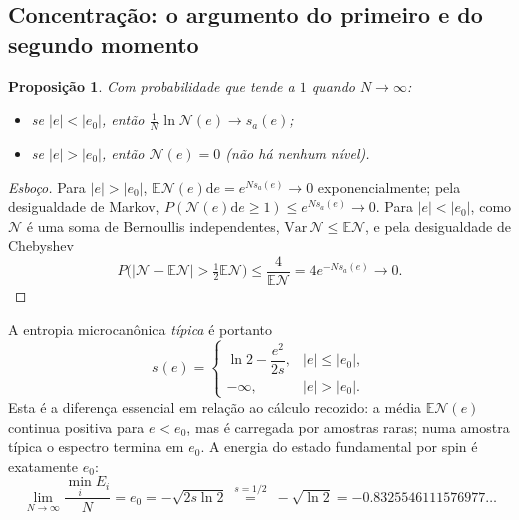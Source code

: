 \documentclass[11pt,a4paper]{article}
\newtheorem{proposicao}{Proposição}
\newcommand{\E}{\mathbb{E}}
\newcommand{\dd}{\mathrm{d}}
\begin{document}
\subsection{Concentração: o argumento do primeiro e do segundo momento}
\begin{proposicao}
Com probabilidade que tende a $1$ quando $N\to\infty$:
\begin{itemize}
\item se $|e|<|e_0|$, então $\frac1N\ln\mathcal N(e)\to s_a(e)$;
\item se $|e|>|e_0|$, então $\mathcal N(e)=0$ (não há nenhum nível).
\end{itemize}
\end{proposicao}
\begin{proof}[Esboço]
Para $|e|>|e_0|$, $\E\mathcal N(e)\dd e=e^{Ns_a(e)}\to0$ exponencialmente; pela desigualdade de
Markov, $P(\mathcal N(e)\dd e\ge1)\le e^{Ns_a(e)}\to0$. Para $|e|<|e_0|$, como $\mathcal N$ é uma soma de
Bernoullis independentes, $\mathrm{Var}\,\mathcal N\le\E\mathcal N$, e pela desigualdade de Chebyshev
\[
  P\Big(\big|\mathcal N-\E\mathcal N\big|>\tfrac12\E\mathcal N\Big)\le\frac{4}{\E\mathcal N}=4e^{-Ns_a(e)}\to0 .
\]
\end{proof}
A entropia microcanônica \emph{típica} é portanto
\begin{equation}
  s(e)=\begin{cases}\ln2-\dfrac{e^2}{2s}, & |e|\le|e_0|,\\[2mm] -\infty, & |e|>|e_0|.\end{cases}
  \label{eq:entropia}
\end{equation}
Esta é a diferença essencial em relação ao cálculo recozido: a média $\E\mathcal N(e)$ continua positiva
para $e<e_0$, mas é carregada por amostras raras; numa amostra típica o espectro termina em $e_0$.
A energia do estado fundamental por spin é exatamente $e_0$:
\begin{equation}
  \lim_{N\to\infty}\frac{\min_i E_i}{N}=e_0=-\sqrt{2s\ln2}
  \;\stackrel{s=1/2}{=}\;-\sqrt{\ln2}=-0.8325546111576977\ldots
\end{equation}
\end{document}

